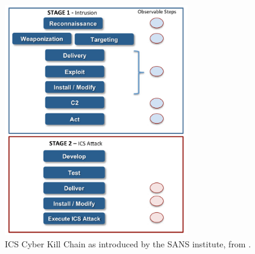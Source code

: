 \documentclass[runningheads]{llncs}
\begin{document}
\begin{figure}[H]
    \centering
    \includegraphics[width=8cm]{figures/ICSCyberKillChain.png}
    \caption{ICS Cyber Kill Chain as introduced by the SANS institute, from \cite{assante.15}.}
    \label{fig:CyberKillChain}
\end{figure}
\end{document}

